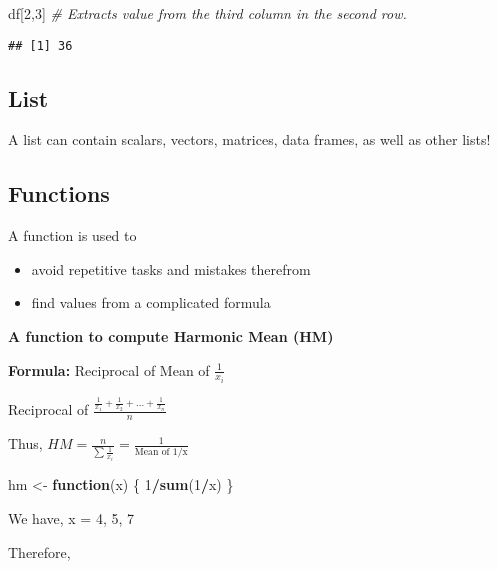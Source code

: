\documentclass[
]{book}
\newenvironment{Shaded}{\begin{snugshade}}{\end{snugshade}}
\newcommand{\CommentTok}[1]{\textcolor[rgb]{0.56,0.35,0.01}{\textit{#1}}}
\newcommand{\ControlFlowTok}[1]{\textcolor[rgb]{0.13,0.29,0.53}{\textbf{#1}}}
\newcommand{\DecValTok}[1]{\textcolor[rgb]{0.00,0.00,0.81}{#1}}
\newcommand{\KeywordTok}[1]{\textcolor[rgb]{0.13,0.29,0.53}{\textbf{#1}}}
\newcommand{\NormalTok}[1]{#1}
\newcommand{\OperatorTok}[1]{\textcolor[rgb]{0.81,0.36,0.00}{\textbf{#1}}}
\newcommand{\StringTok}[1]{\textcolor[rgb]{0.31,0.60,0.02}{#1}}
\providecommand{\tightlist}{%
  \setlength{\itemsep}{0pt}\setlength{\parskip}{0pt}}
\begin{document}
\begin{Shaded}
\begin{Highlighting}[]
\NormalTok{df[}\DecValTok{2}\NormalTok{,}\DecValTok{3}\NormalTok{] }\CommentTok{# Extracts value from the third column in the second row. }
\end{Highlighting}
\end{Shaded}

\begin{verbatim}
## [1] 36
\end{verbatim}

\hypertarget{list}{%
\subsection{List}\label{list}}

A list can contain scalars, vectors, matrices, data frames, as well as other lists!

\hypertarget{functions}{%
\subsection{Functions}\label{functions}}

A function is used to

\begin{itemize}
\tightlist
\item
  avoid repetitive tasks and mistakes therefrom
\item
  find values from a complicated formula
\end{itemize}

\textbf{A function to compute Harmonic Mean (HM)}

\textbf{Formula:} Reciprocal of Mean of \(\frac{1}{x_i}\)

Reciprocal of \(\frac{\frac{1}{x_1}+\frac{1}{x_2}+...+\frac{1}{x_n}}{n}\)

Thus, \(HM = \frac{n}{\sum \frac{1}{x_i}} =\frac 1 {\text{Mean of 1/x}}\)

\begin{Shaded}
\begin{Highlighting}[]
\NormalTok{hm <-}\StringTok{ }\ControlFlowTok{function}\NormalTok{(x) \{}
  \DecValTok{1}\OperatorTok{/}\KeywordTok{sum}\NormalTok{(}\DecValTok{1}\OperatorTok{/}\NormalTok{x)}
\NormalTok{\}}
\end{Highlighting}
\end{Shaded}

We have, x = 4, 5, 7

Therefore,
\end{document}
